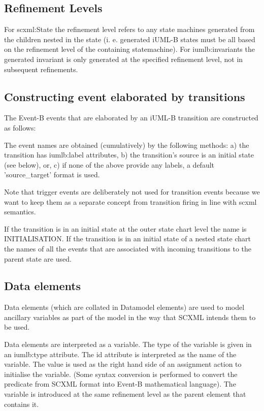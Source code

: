 \documentclass{easychair}
\begin{document}
\subsection{Refinement Levels}
For scxml:State the refinement level refers to any state 
machines generated from the children nested in the state (i.
e. generated iUML-B states must be all based on the 
refinement level of the containing statemachine).
For iumlb:invariants the generated invariant is only 
generated at the specified refinement level, not in 
subsequent refinements.

\subsection{Constructing event elaborated by transitions}
The Event-B events that are elaborated by an iUML-B 
transition are constructed as follows:

The event names are obtained (cumulatively) by the 
following methods:
a)  the transition has iumlb:label attributes,
b) the transition's source is an initial state (see below), 
or,
c) if none of the above provide any labels, a default 
'source\_target' format is used.

Note that trigger events are deliberately not used for 
transition events because we want to keep them as a 
separate concept from transition firing in line with scxml 
semantics.

If the transition is in an initial state at the outer state 
chart level the name is INITIALISATION. 
If the transition is in an initial state of a nested state 
chart the names of all the events that are associated with 
incoming transitions to the parent state are used.

\subsection{Data elements}
Data elements (which are collated in Datamodel elements) 
are used to model ancillary variables as part of the model 
in the way that SCXML intends them to be used.

Data elements are interpreted as a variable. The type of 
the variable is given in an iumlb:type attribute. 
The id attribute is interpreted as the name of the 
variable. The value is used as the right hand side of an 
assignment action to initialise the variable.  (Some syntax 
conversion is performed to convert the predicate from SCXML 
format into Event-B mathematical language). The variable is 
introduced at the same refinement level as the parent 
element that contains it.
\end{document}
